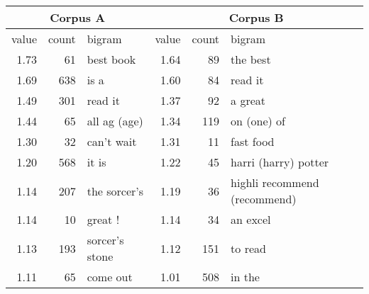 \documentclass[japanese]{jnlp_1.3d}
\begin{document}
\begin{table}[t]
\label{tab:feature_bib}
  \begin{center}
  \begin{tabular}{|r|r|l|r|r|l|} \hline
 \multicolumn{3}{|c|}{Corpus A} &  \multicolumn{3}{|c|}{Corpus B} \\ \hline  
value & count & bigram & value & count & bigram \\ \hline
1.73 & 61 & best book & 1.64 & 89 & the best \\
1.69 & 638 & is a & 1.60 & 84 & read it \\
1.49 & 301 & read it & 1.37 & 92 & a great \\
1.44 & 65 & all ag (age)& 1.34 & 119 & on (one) of \\ 
1.30 & 32 & can't wait & 1.31 & 11 & fast food \\
1.20 & 568 & it is &  1.22 & 45 & harri (harry) potter \\
1.14 & 207 & the sorcer's &  1.19 & 36 & highli recommend  (recommend) \\
1.14 & 10 & great ! & 1.14 & 34 & an excel   \\ 
1.13 & 193 & sorcer's stone & 1.12 & 151 & to read \\
1.11 & 65 & come out & 1.01 & 508 & in the   \\ 
 \hline
\end{tabular}
  \end{center}
\end{table}
\end{document}
